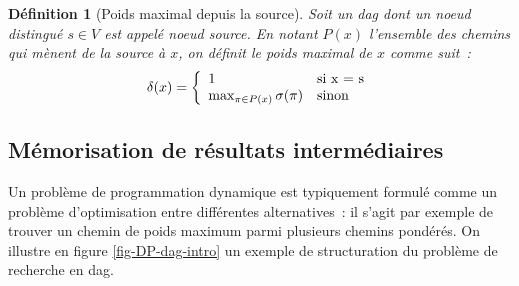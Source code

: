 \documentclass[11pt,openany]{book}
\newtheorem{definition}{Définition}[chapter]
\newcommand{\ac}[1]{{\sc #1}} %
\begin{document}
\begin{definition}[Poids maximal depuis la source]
Soit un \ac{dag} dont un noeud distingué $s\in V$ est appelé noeud source. En notant $P(x)$ l'ensemble des chemins qui mènent de la source
à $x$, on définit le poids maximal de $x$ comme suit~: 
\begin{displaymath}
\delta(x)  = \left\{ 
\begin{array}{ll}
1 & \text{si } $x = s$ \\
\mathop{\text{max}}_{\pi \in P(x)} \sigma(\pi) &\text{sinon}
\end{array}
\right.
\end{displaymath}
\end{definition}


\subsection{Mémorisation de résultats intermédiaires}
Un problème de programmation dynamique est typiquement formulé comme
un problème d'optimisation entre différentes alternatives~: il s'agit
par exemple de trouver un chemin de poids maximum parmi plusieurs
chemins pondérés. On illustre en figure \ref{fig-DP-dag-intro} un
exemple de structuration du problème de recherche en \ac{dag}.
\end{document}
